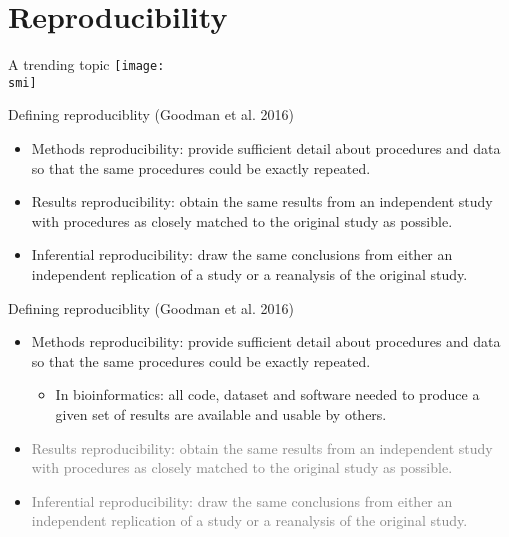 \documentclass[10pt]{beamer}
\def\smi{out/ln/updir/mw-gcthesis-oral/library.bib}
\begin{document}
\section{Reproducibility}
\begin{frame}{A trending topic}
  \def\smi{out/ln/updir/mw-gcthesis-oral/ink/reproducibility/pubmed_trend_reproducibility_crisis.pdf}
  \texttt{[image: \\smi]}%
\end{frame}
\begin{frame}{Defining reproduciblity}
  (Goodman et al. 2016)
  \begin{itemize}
    \item Methods reproducibility: provide sufficient detail about procedures and data so that the same procedures could be exactly repeated.
    \item Results reproducibility: obtain the same results from an independent study with procedures as closely matched to the original study as possible.
    \item Inferential reproducibility: draw the same conclusions from either an independent replication of a study or a reanalysis of the original study.
  \end{itemize}
\end{frame}
\begin{frame}{Defining reproduciblity}
  (Goodman et al. 2016)
  \begin{itemize}
    \item Methods reproducibility: provide sufficient detail about procedures and data so that the same procedures could be exactly repeated.
      \begin{itemize}
        \item In bioinformatics: all code, dataset and software needed to produce a given set of results are available and usable by others.
      \end{itemize}
    \item \textcolor{gray}{Results reproducibility: obtain the same results from an independent study with procedures as closely matched to the original study as possible.}
    \item \textcolor{gray}{Inferential reproducibility: draw the same conclusions from either an independent replication of a study or a reanalysis of the original study.}
  \end{itemize}
\end{frame}
\end{document}
